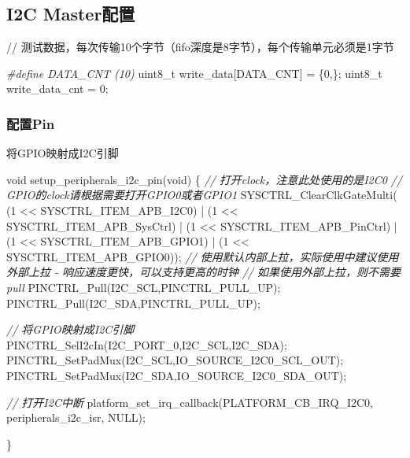 \documentclass[
  12pt,
]{book}
\newenvironment{Shaded}{\begin{snugshade}}{\end{snugshade}}
\newcommand{\CommentTok}[1]{\textcolor[rgb]{0.56,0.35,0.01}{\textit{#1}}}
\newcommand{\DataTypeTok}[1]{\textcolor[rgb]{0.13,0.29,0.53}{#1}}
\newcommand{\DecValTok}[1]{\textcolor[rgb]{0.00,0.00,0.81}{#1}}
\newcommand{\NormalTok}[1]{#1}
\newcommand{\PreprocessorTok}[1]{\textcolor[rgb]{0.56,0.35,0.01}{\textit{#1}}}
\begin{document}
\hypertarget{i2c-masterux914dux7f6e-1}{%
\subsection{I2C Master配置}\label{i2c-masterux914dux7f6e-1}}

// 测试数据，每次传输10个字节（fifo深度是8字节），每个传输单元必须是1字节

\begin{Shaded}
\begin{Highlighting}[]
\PreprocessorTok{#define DATA_CNT (10)}
\DataTypeTok{uint8_t}\NormalTok{ write_data[DATA_CNT] = \{}\DecValTok{0}\NormalTok{,\};}
\DataTypeTok{uint8_t}\NormalTok{ write_data_cnt = }\DecValTok{0}\NormalTok{;}
\end{Highlighting}
\end{Shaded}

\hypertarget{ux914dux7f6epin-2}{%
\subsubsection{配置Pin}\label{ux914dux7f6epin-2}}

将GPIO映射成I2C引脚

\begin{Shaded}
\begin{Highlighting}[]
\DataTypeTok{void}\NormalTok{ setup_peripherals_i2c_pin(}\DataTypeTok{void}\NormalTok{)}
\NormalTok{\{}
  \CommentTok{// 打开clock，注意此处使用的是I2C0}
  \CommentTok{// GPIO的clock请根据需要打开GPIO0或者GPIO1}
\NormalTok{  SYSCTRL_ClearClkGateMulti(    (}\DecValTok{1}\NormalTok{ << SYSCTRL_ITEM_APB_I2C0)}
\NormalTok{                                | (}\DecValTok{1}\NormalTok{ << SYSCTRL_ITEM_APB_SysCtrl)}
\NormalTok{                                | (}\DecValTok{1}\NormalTok{ << SYSCTRL_ITEM_APB_PinCtrl)}
\NormalTok{                                | (}\DecValTok{1}\NormalTok{ << SYSCTRL_ITEM_APB_GPIO1)}
\NormalTok{                                | (}\DecValTok{1}\NormalTok{ << SYSCTRL_ITEM_APB_GPIO0));}
  \CommentTok{// 使用默认内部上拉，实际使用中建议使用外部上拉 - 响应速度更快，可以支持更高的时钟}
  \CommentTok{// 如果使用外部上拉，则不需要pull}
\NormalTok{  PINCTRL_Pull(I2C_SCL,PINCTRL_PULL_UP);}
\NormalTok{  PINCTRL_Pull(I2C_SDA,PINCTRL_PULL_UP);}
  
  \CommentTok{// 将GPIO映射成I2C引脚}
\NormalTok{  PINCTRL_SelI2cIn(I2C_PORT_0,I2C_SCL,I2C_SDA);}
\NormalTok{  PINCTRL_SetPadMux(I2C_SCL,IO_SOURCE_I2C0_SCL_OUT);}
\NormalTok{  PINCTRL_SetPadMux(I2C_SDA,IO_SOURCE_I2C0_SDA_OUT);}
  
  \CommentTok{// 打开I2C中断}
\NormalTok{  platform_set_irq_callback(PLATFORM_CB_IRQ_I2C0, peripherals_i2c_isr, NULL);}
  
\NormalTok{\}}
\end{Highlighting}
\end{Shaded}
\end{document}
